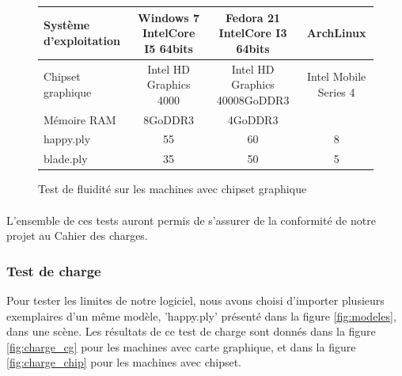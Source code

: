 \begin{figure}[h]
  \begin{changemargin}{-4cm}{-4cm}
    \centering
    \begin{tabular}{|l|c|c|c|}
      \hline
      Système d'exploitation & Windows 7 IntelCore I5 64bits & Fedora 21 IntelCore I3 64bits & ArchLinux\\ \hline
      Chipset graphique &  Intel HD Graphics 4000 & Intel HD Graphics 40008GoDDR3 & Intel Mobile Series 4 \\ \hline
      Mémoire RAM & 8GoDDR3 & 4GoDDR3  & \\ \hline \hline
      happy.ply & 55 & 60 & 8\\ \hline
      blade.ply & 35 & 50 & 5\\ \hline
    \end{tabular}
  \end{changemargin}
  \caption{Test de fluidité sur les machines avec chipset graphique}
  \label{tab:fps_chip}
\end{figure}

\paragraph{}
L'ensemble de ces tests auront permis de s'assurer de la conformité de notre projet au Cahier des charges. 

\subsubsection{Test de charge}
Pour tester les limites de notre logiciel, nous avons choisi d'importer plusieurs exemplaires d'un même modèle, 'happy.ply' présenté dans la figure \ref{fig:modeles}, dans une scène. Les résultats de ce test de charge sont donnés dans la figure \ref{fig:charge_cg} pour les machines avec carte graphique, et dans la figure \ref{fig:charge_chip} pour les machines avec chipset.

